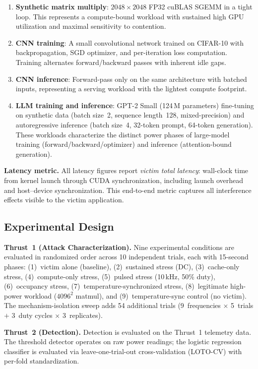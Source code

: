 \documentclass[letterpaper,twocolumn,10pt]{article}
\begin{document}
\begin{enumerate}[nosep]
\item \textbf{Synthetic matrix multiply}: $2048 \times 2048$ FP32
  cuBLAS SGEMM in a tight loop.  This represents a
  compute-bound workload with sustained high GPU utilization and
  maximal sensitivity to contention.
\item \textbf{CNN training}: A small convolutional network trained
  on CIFAR-10 with backpropagation, SGD optimizer, and per-iteration
  loss computation.  Training alternates forward/backward passes with
  inherent idle gaps.
\item \textbf{CNN inference}: Forward-pass only on the same
  architecture with batched inputs, representing a serving workload
  with the lightest compute footprint.
\item \textbf{LLM training and inference}: GPT-2 Small (124\,M
  parameters) fine-tuning on synthetic data (batch size~2,
  sequence length~128, mixed-precision) and autoregressive
  inference (batch size~4, 32-token prompt, 64-token generation).
  These workloads characterize the distinct power phases of
  large-model training (forward/backward/optimizer) and
  inference (attention-bound generation).
\end{enumerate}

\textbf{Latency metric.}  All latency figures report
\emph{victim total latency}: wall-clock time from kernel launch
through CUDA synchronization, including launch overhead and
host--device synchronization.  This end-to-end metric captures all
interference effects visible to the victim application.

\subsection{Experimental Design}
\label{sec:exp-design}

\textbf{Thrust~1 (Attack Characterization).}
Nine experimental conditions are evaluated in randomized order across
10 independent trials, each with 15-second phases:
(1)~victim alone (baseline), (2)~sustained stress (DC),
(3)~cache-only stress, (4)~compute-only stress,
(5)~pulsed stress (10\,kHz, 50\% duty),
(6)~occupancy stress,
(7)~temperature-synchronized stress,
(8)~legitimate high-power workload ($4096^2$ matmul), and
(9)~temperature-sync control (no victim).
The mechanism-isolation sweep adds 54 additional trials
(9~frequencies $\times$ 5~trials $+$ 3~duty cycles $\times$
3~replicates).

\textbf{Thrust~2 (Detection).}
Detection is evaluated on the Thrust~1 telemetry data.  The
threshold detector operates on raw power readings; the logistic
regression classifier is evaluated via leave-one-trial-out
cross-validation (LOTO-CV) with per-fold standardization.
\end{document}
